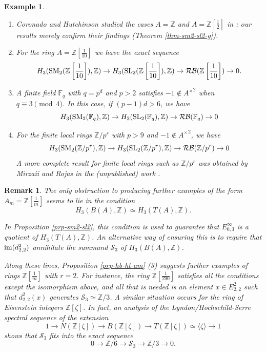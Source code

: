 \documentclass[11pt]{amsart}
\theoremstyle{definition}
\theoremstyle{plain}
\newtheorem{rem}[ntn]{Remark}
\newtheorem{exm}[ntn]{Example}
\numberwithin{equation}{section}
\newcommand{\z}{\mathbb{Z}}
\newcommand{\F}{\mathbb{F}}
\newcommand{\RB}{\mathcal{RB}}
\renewcommand{\SS}{\mathcal{S}}
\renewcommand{\aa}{{A^\times}}
\newcommand{\half}{{\left[\frac{1}{2}\right]}}
\newcommand{\mth}[1]{\left[ \frac{1}{#1} \right]}
\newcommand{\lan}{\langle}
\newcommand{\ran}{\rangle}
\newcommand{\SL}{\mathit{{\rm SL}}}
\newcommand{\SM}{\mathit{{\rm SM}}}
\newcommand{\im}{{\rm im}}
\begin{document}
\begin{exm}
    \begin{enumerate}
        \item Coronado and Hutchinson studied the cases $A=\z$ and $A=\z\half$ in \cite[\S 8]{C-H2022}; our results merely confirm their findings (Theorem \ref{thm-sm2-sl2-g}). 
        \item For the ring $A=\z\mth{10}$ we have the exact sequence
        \[
            H_3(\SM_2(\z\mth{10}),\z)\to H_3(\SL_2(\z\mth{10}),\z)\to \RB(\z\mth{10})\to 0.
        \]
        \item A finite field $\F_q$ with $q=p^d$ and $p>2$ satisfies $-1\notin \aa^2$ when $q\equiv 3 \pmod 4$. In this case, if $(p-1)d>6$, we have 
        \[
            H_3(\SM_2(\F_q),\z)\to H_3(\SL_2(\F_q),\z)\to \RB(\F_q)\to 0
        \]
        \item For the finite local rings $\z/p^r$ with $p>9$ and $-1\notin\aa^2$, we have
        \[
            H_3(\SM_2(\z/p^r),\z)\to H_3(\SL_2(\z/p^r),\z)\to \RB(\z/p^r)\to 0
        \]
        A more complete result for finite local rings such as $\z/p^r$ was obtained by Mirzaii and Rojas in the (unpublished) work \cite[Theorem 6.2]{B-R--2025}.
    \end{enumerate}
\end{exm}
\begin{rem}\label{lack-on-zm}
    The only obstruction to producing further examples of the form $A_m=\z\mth{m}$ seems to lie in the condition 
    \[
        H_3(B(A),\z)\simeq H_3(T(A),\z).    
    \]
    
    In Proposition \ref{prp-sm2-sl2}, this condition is used to guarantee that $E^\infty_{0,3}$ is a quotient of $H_3(T(A),\z)$. An alternative way of ensuring this is to require that $\im(d^2_{2,2})$ annihilate the summand $\SS_3$ of $H_3(B(A),\z)$.
    
    Along these lines, Proposition \ref{prp-hb-ht-am} (3) suggests further examples of rings $\z\mth{m}$ with $r=2$. For instance, the ring $\z\mth{290}$ satisfies all the conditions except the isomorphism above, and all that is needed is an element $x\in E^2_{2,2}$ such that $d^2_{2,2}(x)$ generates $\SS_3\simeq\z/3$. A similar situation occurs for the ring of Eisenstein integers $\z[\zeta]$. In fact, an analysis of the Lyndon/Hochschild-Serre spectral sequence of the extension
    \[
        1\to N(\z[\zeta]) \to B(\z[\zeta])\to T(\z[\zeta])\simeq\lan\zeta\ran\to 1
    \]
    shows that $\SS_3$ fits into the exact sequence
    \[
        0\to \z/6\to\SS_3\to \z/3\to 0.
    \]
\end{rem}
\end{document}
